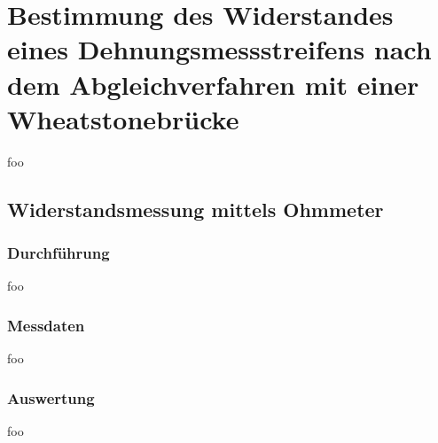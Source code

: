 \chapter[Wheatstonebrücke]{Bestimmung des Widerstandes eines Dehnungsmessstreifens nach dem Abgleichverfahren mit einer Wheatstonebrücke}

foo

\section[Ohmmeter]{Widerstandsmessung mittels Ohmmeter}
\subsection{Durchführung}

foo

\subsection{Messdaten}

foo

\subsection{Auswertung}

foo